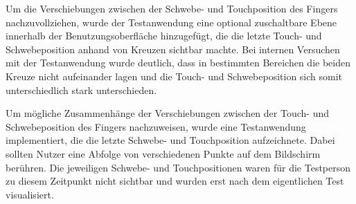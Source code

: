 \documentclass[12pt,numbers=noenddot,parskip,bibliography=totocnumbered,listof=totocnumbered]{scrreprt}
\begin{document}
Um die Verschiebungen zwischen der Schwebe- und Touchposition des Fingers nachzuvollziehen, wurde der Testanwendung eine optional zuschaltbare Ebene innerhalb der Benutzungsoberfläche hinzugefügt, die die letzte Touch- und Schwebeposition anhand von Kreuzen sichtbar machte. Bei internen Versuchen mit der Testanwendung wurde deutlich, dass in bestimmten Bereichen die beiden Kreuze nicht aufeinander lagen und die Touch- und Schwebeposition sich somit unterschiedlich stark unterschieden.

Um mögliche Zusammenhänge der Verschiebungen zwischen der Touch- und Schwebeposition des Fingers nachzuweisen, wurde eine Testanwendung implementiert, die die letzte Schwebe- und Touchposition aufzeichnete. Dabei sollten Nutzer eine Abfolge von verschiedenen Punkte auf dem Bildschirm berühren. Die jeweiligen Schwebe- und Touchpositionen waren für die Testperson zu diesem Zeitpunkt nicht sichtbar und wurden erst nach dem eigentlichen Test visualisiert.
\end{document}

